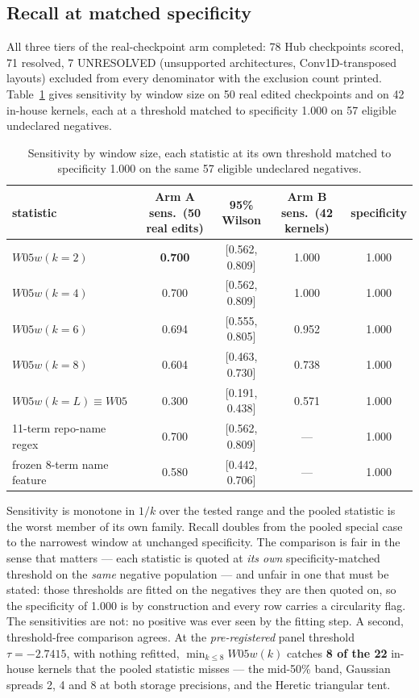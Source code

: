 \documentclass[11pt,letterpaper]{article}
\begin{document}
\subsection{Recall at matched specificity}

All three tiers of the real-checkpoint arm completed: 78 Hub checkpoints scored, 71 resolved, 7 UNRESOLVED (unsupported architectures, Conv1D-transposed layouts) excluded from every denominator with the exclusion count printed. Table~\ref{tab:windowed} gives sensitivity by window size on 50 real edited checkpoints and on 42 in-house kernels, each at a threshold matched to specificity 1.000 on 57 eligible undeclared negatives.

\begin{table}[!htbp]
\centering
\caption{Sensitivity by window size, each statistic at its own threshold matched to specificity 1.000 on the same 57 eligible undeclared negatives.}
\label{tab:windowed}
\footnotesize
\setlength{\tabcolsep}{4pt}
\begin{tabular}{lcccc}
\toprule
statistic & Arm A sens.\ (50 real edits) & 95\% Wilson & Arm B sens.\ (42 kernels) & specificity \\
\midrule
$W05w(k{=}2)$ & \textbf{0.700} & [0.562, 0.809] & 1.000 & 1.000 \\
$W05w(k{=}4)$ & 0.700 & [0.562, 0.809] & 1.000 & 1.000 \\
$W05w(k{=}6)$ & 0.694 & [0.555, 0.805] & 0.952 & 1.000 \\
$W05w(k{=}8)$ & 0.604 & [0.463, 0.730] & 0.738 & 1.000 \\
$W05w(k{=}L)\equiv W05$ & 0.300 & [0.191, 0.438] & 0.571 & 1.000 \\
11-term repo-name regex & 0.700 & [0.562, 0.809] & --- & 1.000 \\
frozen 8-term name feature & 0.580 & [0.442, 0.706] & --- & 1.000 \\
\bottomrule
\end{tabular}
\end{table}

Sensitivity is monotone in $1/k$ over the tested range and the pooled statistic is the worst member of its own family. Recall doubles from the pooled special case to the narrowest window at unchanged specificity. The comparison is fair in the sense that matters --- each statistic is quoted at \emph{its own} specificity-matched threshold on the \emph{same} negative population --- and unfair in one that must be stated: those thresholds are fitted on the negatives they are then quoted on, so the specificity of 1.000 is by construction and every row carries a circularity flag. The sensitivities are not: no positive was ever seen by the fitting step. A second, threshold-free comparison agrees. At the \emph{pre-registered} panel threshold $\tau = -2.7415$, with nothing refitted, $\min_{k\le 8} W05w(k)$ catches \textbf{8 of the 22} in-house kernels that the pooled statistic misses --- the mid-50\% band, Gaussian spreads 2, 4 and 8 at both storage precisions, and the Heretic triangular tent.
\end{document}
